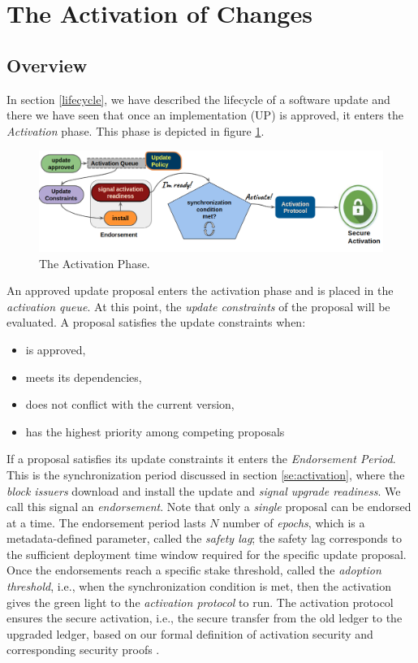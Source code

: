 \section{The Activation of Changes}\label{the_activation_of_changes}

\subsection{Overview}\label{sec:activation_overview}
In section \ref{lifecycle}, we have described the lifecycle of a software 
update and there we have seen that once an implementation (UP) is approved, it 
enters the \emph{Activation} phase. This phase is depicted in figure 
\ref{fig:activation_phase_overview}.

\begin{figure}[h!] %
	\centering
	\includegraphics[width=0.8\columnwidth,
	keepaspectratio]{figures/activation_phase.png}
	\caption{The Activation Phase.}
	\label{fig:activation_phase_overview}
\end{figure}

An approved update proposal enters the activation phase and is placed in the
\emph{activation queue}. At this point, the
\emph{update constraints} of the proposal will be evaluated. A proposal
satisfies the update constraints when:
\begin{itemize}
	\item is approved,
	\item meets its dependencies,
	\item does not conflict with the current version,
	\item has the highest priority among competing proposals
\end{itemize}

If a proposal satisfies its update constraints it enters the \emph{Endorsement
Period}. This is the synchronization period discussed in section 	
\ref{se:activation}, where the \emph{block issuers} download and
install the update and \emph{signal upgrade readiness}. We call this signal an 
\emph{endorsement}. Note that only a
\emph{single} proposal can be endorsed at a time. The endorsement period lasts
$N$ number of \emph{epochs}, which is a metadata-defined parameter, called the
\emph{safety lag}; the safety lag corresponds to the sufficient deployment time
window required for the specific update proposal. Once the endorsements reach a
specific stake threshold, called the \emph{adoption threshold}, i.e., when the 
synchronization condition is met, then the activation
gives the green light to the \emph{activation protocol} to run. The activation
protocol ensures the secure activation, i.e., the secure transfer from the old
ledger to the upgraded ledger, based on our formal definition of activation
security and corresponding security proofs \cite{secure_activation}. 

